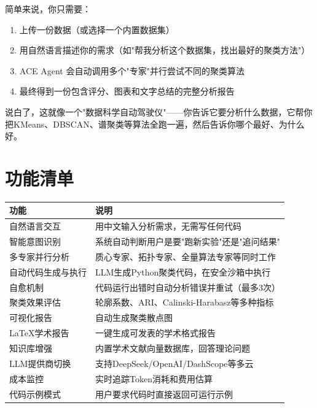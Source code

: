 \documentclass[11pt,a4paper]{ctexbook}
\begin{document}
简单来说，你只需要：
\begin{enumerate}
    \item 上传一份数据（或选择一个内置数据集）
    \item 用自然语言描述你的需求（如"帮我分析这个数据集，找出最好的聚类方法"）
    \item ACE Agent 会自动调用多个"专家"并行尝试不同的聚类算法
    \item 最终得到一份包含评分、图表和文字总结的完整分析报告
\end{enumerate}

\begin{plainbox}
    说白了，这就像一个"数据科学自动驾驶仪"——你告诉它要分析什么数据，它帮你把KMeans、DBSCAN、谱聚类等算法全跑一遍，然后告诉你哪个最好、为什么好。
\end{plainbox}

\section{功能清单}

\begin{longtable}{p{4cm} p{9cm}}
    \toprule
    \textbf{功能} & \textbf{说明} \\
    \midrule
    自然语言交互 & 用中文输入分析需求，无需写任何代码 \\
    \midrule
    智能意图识别 & 系统自动判断用户是要"跑新实验"还是"追问结果" \\
    \midrule
    多专家并行分析 & 质心专家、拓扑专家、全量算法专家等同时工作 \\
    \midrule
    自动代码生成与执行 & LLM生成Python聚类代码，在安全沙箱中执行 \\
    \midrule
    自愈机制 & 代码运行出错时自动分析错误并重试（最多3次） \\
    \midrule
    聚类效果评估 & 轮廓系数、ARI、Calinski-Harabasz等多种指标 \\
    \midrule
    可视化报告 & 自动生成聚类散点图 \\
    \midrule
    LaTeX学术报告 & 一键生成可发表的学术格式报告 \\
    \midrule
    知识库增强 & 内置学术文献向量数据库，回答理论问题 \\
    \midrule
    LLM提供商切换 & 支持DeepSeek/OpenAI/DashScope等多云 \\
    \midrule
    成本监控 & 实时追踪Token消耗和费用估算 \\
    \midrule
    代码示例模式 & 用户要求代码时直接返回可运行示例 \\
    \bottomrule
\end{longtable}
\end{document}
